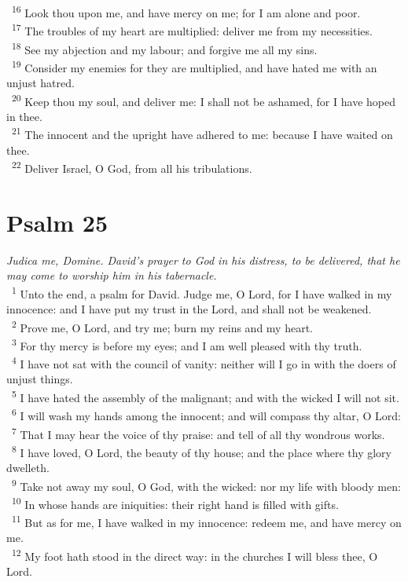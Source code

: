 \documentclass[a5paper,12pt]{article}
\begin{document}
\begin{multicols*}{2}
~\textsuperscript{16} Look thou upon me, and have mercy on me; for I am alone and poor.\\
~\textsuperscript{17} The troubles of my heart are multiplied: deliver me from my necessities.\\
~\textsuperscript{18} See my abjection and my labour; and forgive me all my sins.\\
~\textsuperscript{19} Consider my enemies for they are multiplied, and have hated me with an unjust hatred.\\
~\textsuperscript{20} Keep thou my soul, and deliver me: I shall not be ashamed, for I have hoped in thee.\\
~\textsuperscript{21} The innocent and the upright have adhered to me: because I have waited on thee.\\
~\textsuperscript{22} Deliver Israel, O God, from all his tribulations.\\

\section{Psalm 25}
\label{sec:org378e548}
\emph{Judica me, Domine. David's prayer to God in his distress, to be delivered, that he may come to worship him in his tabernacle.}\\

~\textsuperscript{1} Unto the end, a psalm for David. Judge me, O Lord, for I have walked in my innocence: and I have put my trust in the Lord, and shall not be weakened.\\
~\textsuperscript{2} Prove me, O Lord, and try me; burn my reins and my heart.\\
~\textsuperscript{3} For thy mercy is before my eyes; and I am well pleased with thy truth.\\
~\textsuperscript{4} I have not sat with the council of vanity: neither will I go in with the doers of unjust things.\\
~\textsuperscript{5} I have hated the assembly of the malignant; and with the wicked I will not sit.\\
~\textsuperscript{6} I will wash my hands among the innocent; and will compass thy altar, O Lord:\\
~\textsuperscript{7} That I may hear the voice of thy praise: and tell of all thy wondrous works.\\
~\textsuperscript{8} I have loved, O Lord, the beauty of thy house; and the place where thy glory dwelleth.\\
~\textsuperscript{9} Take not away my soul, O God, with the wicked: nor my life with bloody men:\\
~\textsuperscript{10} In whose hands are iniquities: their right hand is filled with gifts.\\
~\textsuperscript{11} But as for me, I have walked in my innocence: redeem me, and have mercy on me.\\
~\textsuperscript{12} My foot hath stood in the direct way: in the churches I will bless thee, O Lord.\\


\end{multicols*}
\end{document}
